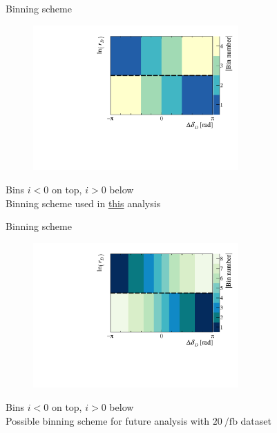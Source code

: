 \documentclass{beamer}
\begin{document}
\begin{frame}{Binning scheme}
  \begin{figure}
    \centering
    \includegraphics[width = 0.7\textwidth]{Plots/BinningSchemePlot_4Bins.pdf}
  \end{figure}
  \begin{center}
    Bins $i < 0$ on top, $i > 0$ below\\
    Binning scheme used in \underline{this} analysis
  \end{center}
\end{frame}

\begin{frame}{Binning scheme}
  \begin{figure}
    \centering
    \includegraphics[width = 0.7\textwidth]{Plots/BinningSchemePlot_8Bins.pdf}
  \end{figure}
  \begin{center}
    Bins $i < 0$ on top, $i > 0$ below\\
    Possible binning scheme for future analysis with $\SI{20}{\per\femto\barn}$ dataset
  \end{center}
\end{frame}
\end{document}
